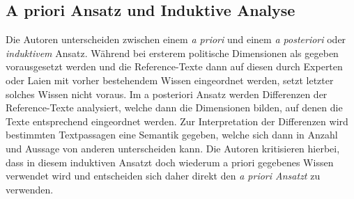   
  \subsection{A priori Ansatz und Induktive Analyse}
Die Autoren unterscheiden zwischen einem \emph{a priori} und einem \emph{a posteriori} oder \emph{induktivem} Ansatz. Während bei ersterem politische Dimensionen als gegeben vorausgesetzt werden und die Reference-Texte dann auf diesen durch Experten oder Laien mit vorher bestehendem Wissen eingeordnet werden, setzt letzter solches Wissen nicht voraus. Im a posteriori Ansatz werden Differenzen der Reference-Texte analysiert, welche dann die Dimensionen bilden, auf denen die Texte entsprechend eingeordnet werden. 
Zur Interpretation der Differenzen wird bestimmten Textpassagen eine Semantik gegeben, welche sich dann in Anzahl und Aussage von anderen unterscheiden kann. Die Autoren kritisieren hierbei, dass in diesem induktiven Ansatzt doch wiederum a priori gegebenes Wissen verwendet wird und entscheiden sich daher direkt den \emph{a priori Ansatzt} zu verwenden.
  
  
